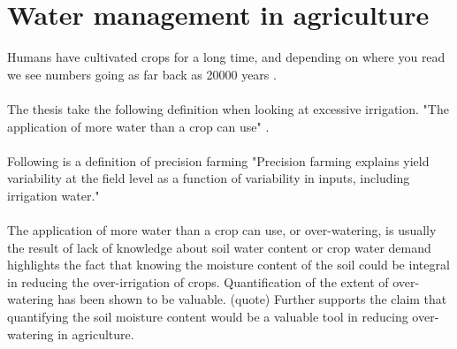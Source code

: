 \documentclass[]{uiophd}
\begin{document}
\section{Water management in agriculture}
Humans have cultivated crops for a long time, and depending on where you read we see numbers going as far back as 20000 years \cite{10.1371/journal.pone.0131422}.
\\\\
The thesis take the following definition when looking at excessive irrigation. "The application of more water than a crop can use" \cite{LILIENFELD200773}.
\\\\
Following is a definition of precision farming "Precision farming explains yield variability at the field level as a function of variability in inputs, including irrigation water." \cite{LILIENFELD200773}
\\\\

The application of more water than a crop can use, or over-watering, is usually the result of lack of knowledge about soil water content or crop water demand \cite{LILIENFELD200773} highlights the fact that knowing the moisture content of the soil could be integral in reducing the over-irrigation of crops. Quantification of the extent of over-watering has been shown to be valuable. (quote) Further supports the claim that quantifying the soil moisture content would be a valuable tool in reducing over-watering in agriculture.
\end{document}

